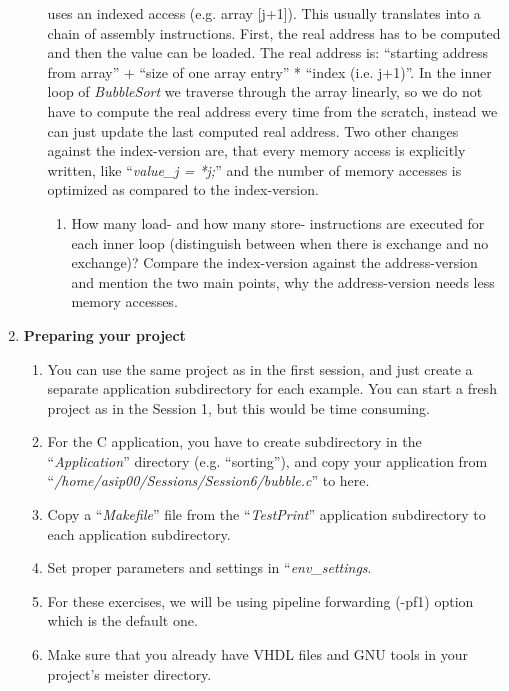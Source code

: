 \begin{enumerate}
\begin{enumerate}
		uses an indexed access (e.g. array {[}j+1{]}). This usually
		translates into a chain of assembly instructions. First, the real
		address has to be computed and then the value can be loaded. The
		real address is: ``starting address from array'' + ``size of one
		array entry'' * ``index (i.e. j+1)''. In the inner loop of
		\emph{BubbleSort} we traverse through the array linearly, so we do
		not have to compute the real address every time from the scratch,
		instead we can just update the last computed real address. Two other
		changes against the index-version are, that every memory access is
		explicitly written, like ``\emph{value\_j = *j;}'' and the number of
		memory accesses is optimized as compared to the index-version.
		\begin{enumerate}[label=(\alph*),start=2]
			\color{red}\item\normalcolor
			How many load- and how many store- instructions are executed for each
			inner loop (distinguish between when there is exchange and no
			exchange)? Compare the index-version against the address-version and
			mention the two main points, why the address-version needs less memory
			accesses.
		\end{enumerate}
	\end{enumerate}
\item \textbf{Preparing your project}
	\begin{enumerate}
		\item
		You can use the same project as in the first session, and just
		create a separate application subdirectory for each example. You can
		start a fresh project as in the Session 1, but this would be time
		consuming.
		\item
		For the C application, you have to create subdirectory in the
		``\emph{Application}'' directory (e.g. ``sorting''), and copy your
		application from ``\emph{/home/asip00/Sessions/Session6/bubble.c}''
		to here.
		\item
		Copy a ``\emph{Makefile}'' file from the ``\emph{TestPrint}''
		application subdirectory to each application subdirectory.
		\item
		Set proper parameters and settings in ``\emph{env\_settings}.
		\item
		For these exercises, we will be using pipeline forwarding (-pf1)
		option which is the default one.
		\item
		Make sure that you already have VHDL files and GNU tools in your
		project's meister directory.
	\end{enumerate}

\end{enumerate}
